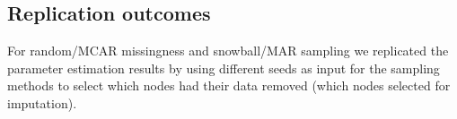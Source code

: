 \documentclass{article}
\begin{document}
%
%	


\subsection{Replication outcomes}
For random/MCAR missingness and snowball/MAR sampling we replicated the parameter estimation results by using different seeds as input for the sampling methods to select which nodes had their data removed (which nodes selected for imputation).
\end{document}
